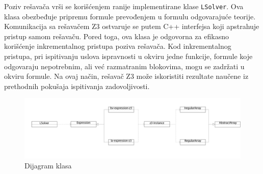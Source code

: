 \documentclass[12pt,oneside]{memoir}
\begin{document}
Poziv rešavača vrši se korišćenjem ranije implementirane klase \texttt{LSolver}. Ova klasa obezbeđuje pripremu formule prevođenjem u formulu odgovarajuće teorije. Komunikacija sa rešavačem Z3 ostvaruje se putem C++ interfejsa koji apstrahuje pristup samom rešavaču. Pored toga, ova klasa je odgovorna za efikasno korišćenje inkrementalnog pristupa poziva rešavača. Kod inkrementalnog pristupa, pri ispitivanju uslova ispravnosti u okviru jedne funkcije, formule koje odgovaraju nepotrebnim, ali već razmatranim blokovima, mogu se zadržati u okviru formule. Na ovaj način, rešavač Z3 može iskoristiti rezultate naučene iz prethodnih pokušaja ispitivanja zadovoljivosti.

\begin{figure}[!ht]
\hspace{-1.5cm}
  \includegraphics[width=1.2\textwidth]{dijagram.png}
  \caption{Dijagram klasa}
  \label{fig:dijagram}
\end{figure}
\end{document}
